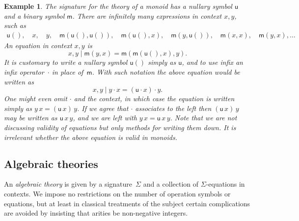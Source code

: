 \documentclass{amsart}
\newtheorem{example}[definition]{Example}
\begin{document}
\begin{example}
  \label{ex:monoid-signature}
  The signature for the theory of a monoid has a nullary symbol $\mathsf{u}$ and a binary
  symbol $\mathsf{m}$. There are infinitely many expressions in context $x, y$, such as
  \begin{align*}
    \mathsf{u}(),\quad
    x,\quad
    y,\quad
    \mathsf{m}(\mathsf{u}(), \mathsf{u}()),\quad
    \mathsf{m}(\mathsf{u}(), x),\quad
    \mathsf{m}(y, \mathsf{u}()),\quad
    \mathsf{m}(x, x),\quad
    \mathsf{m}(y, x),
    \ldots
  \end{align*}
  An equation in context $x, y$ is
  \begin{equation*}
    x, y \mid \mathsf{m}(y, x) = \mathsf{m}(\mathsf{m}(\mathsf{u}(), x), y).
  \end{equation*}
  It is customary to write a nullary symbol $\mathsf{u}()$ simply as $\mathsf{u}$, and to
  use infix an infix operator~$\cdot$ in place of~$\mathsf{m}$. With such notation the
  above equation would be written as
  \begin{equation*}
    x, y \mid y \cdot x = (\mathsf{u} \cdot x) \cdot y.
  \end{equation*}
  One might even omit $\cdot$ and the context, in which case the equation is written
  simply as $y \, x = (\mathsf{u} \, x) \, y$. If we agree that $\cdot$ associates to the
  left then $(\mathsf{u} \, x) \, y$ may be written as $\mathsf{u} \, x \, y$, and we are
  left with $y \, x = \mathsf{u} \, x \, y$. Note that we are \emph{not} discussing
  validity of equations but only methods for writing them down. It is irrelevant whether
  the above equation is valid in monoids.
\end{example}


\subsection{Algebraic theories}
\label{sec:algebraic-theories-1}

An \emph{algebraic theory} is given by a signature~$\Sigma$ and a collection of
$\Sigma$-equations in contexts.
%
We impose no restrictions on the number of operation symbols or equations, but at least in
classical treatments of the subject certain complications are avoided by insisting that
arities be non-negative integers.
\end{document}
